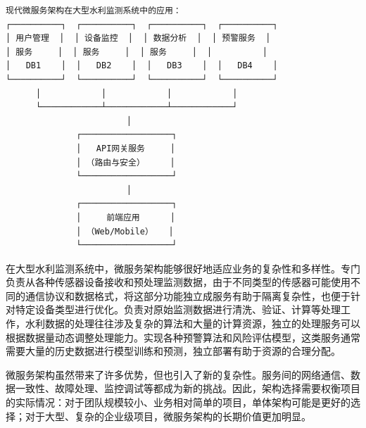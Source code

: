 \begin{lstlisting}
现代微服务架构在大型水利监测系统中的应用：
┌──────────┐  ┌──────────┐  ┌──────────┐  ┌──────────┐
│ 用户管理  │  │ 设备监控  │  │ 数据分析  │  │ 预警服务  │
│ 服务     │  │ 服务     │  │ 服务     │  │          │
│   DB1    │  │   DB2    │  │   DB3    │  │   DB4    │
└──────────┘  └──────────┘  └──────────┘  └──────────┘
      │            │            │            │
      └────────────┴────────────┴────────────┘
                        │
              ┌──────────────────┐
              │   API网关服务     │
              │ （路由与安全）     │
              └──────────────────┘
                        │
              ┌──────────────────┐
              │     前端应用      │
              │ （Web/Mobile）   │
              └──────────────────┘
\end{lstlisting}

在大型水利监测系统中，微服务架构能够很好地适应业务的复杂性和多样性。专门负责从各种传感器设备接收和预处理监测数据，由于不同类型的传感器可能使用不同的通信协议和数据格式，将这部分功能独立成服务有助于隔离复杂性，也便于针对特定设备类型进行优化。负责对原始监测数据进行清洗、验证、计算等处理工作，水利数据的处理往往涉及复杂的算法和大量的计算资源，独立的处理服务可以根据数据量动态调整处理能力。实现各种预警算法和风险评估模型，这类服务通常需要大量的历史数据进行模型训练和预测，独立部署有助于资源的合理分配。

微服务架构虽然带来了许多优势，但也引入了新的复杂性。服务间的网络通信、数据一致性、故障处理、监控调试等都成为新的挑战。因此，架构选择需要权衡项目的实际情况：对于团队规模较小、业务相对简单的项目，单体架构可能是更好的选择；对于大型、复杂的企业级项目，微服务架构的长期价值更加明显。

